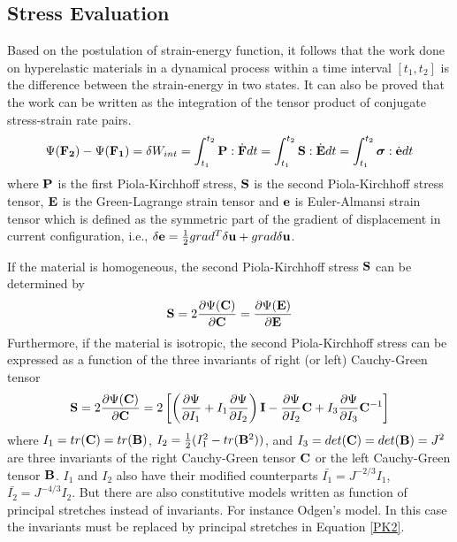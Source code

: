 \subsection{Stress Evaluation}
Based on the postulation of strain-energy function, it follows that the work done on hyperelastic materials in a dynamical process within a time interval $[t_1, t_2]$ is the difference between the strain-energy in two states. It can also be proved that the work can be written as the integration of the tensor product of conjugate stress-strain rate pairs.
\begin{equation}
\Psi({\bold{F_2}}) - \Psi({\bold{F_1}}) = \delta{W_{int}} = \int_{t_1}^{t_2}\bold{P}:\dot{\bold{F}}dt = \int_{t_1}^{t_2}\bold{S}:\dot{\bold{E}}dt = 
\int_{t_1}^{t_2}\boldsymbol{\sigma}:\dot{\bold{e}}dt
\end{equation}
where $\bold{P}$ is the first Piola-Kirchhoff stress, $\bold{S}$ is the second Piola-Kirchhoff stress tensor, $\bold{E}$ is the Green-Lagrange strain tensor and $\bold{e}$ is Euler-Almansi strain tensor which is defined as the symmetric part of the gradient of displacement in current configuration, i.e., $\delta\bold{e} = \frac{1}{2}{ grad^T\delta\bold{u} + grad\delta\bold{u}}$.

If the material is homogeneous, the second Piola-Kirchhoff stress $\bold{S}$ can be determined by 
\begin{equation}
\bold{S} = 2\frac{\partial\Psi(\bold{C})}{\partial{\bold{C}}} = \frac{\partial\Psi(\bold{E})}{\partial{\bold{E}}}
\end{equation}
Furthermore, if the material is isotropic, the second Piola-Kirchhoff stress can be expressed as a function of the three invariants of right (or left) Cauchy-Green tensor
\begin{equation} \label{PK2}
\bold{S} = 2\frac{\partial\Psi({\bold{C})}}{\partial{\bold{C}}} = 2\left[\left( \frac{\partial\Psi}{\partial{I_1}} + I_1 \frac{\partial\Psi}{\partial{I_2}} \right)\bold{I} -  \frac{\partial\Psi}{\partial{I_2}}\bold{C} + I_3 \frac{\partial\Psi}{\partial{I_3}}{\bold{C}}^{-1} \right]
\end{equation}
where $I_1 = tr(\bold{C}) = tr(\bold{B})$, $I_2 = \frac{1}{2}(I_1^2 - tr(\bold{B}^2))$, and $I_3 = det(\bold{C}) = det(\bold{B}) = J^2$ are three invariants of the right Cauchy-Green tensor $\bold{C}$ or the left Cauchy-Green tensor $\bold{B}$. $I_1$ and $I_2$ also have their modified counterparts $\bar{I_1} = J^{-2/3}I_1$, $\bar{I_2} = J^{-4/3}I_2$. But there are also constitutive models written as function of principal stretches instead of invariants. For instance Odgen's model. In this case the invariants must be replaced by principal stretches in Equation \ref{PK2}.

